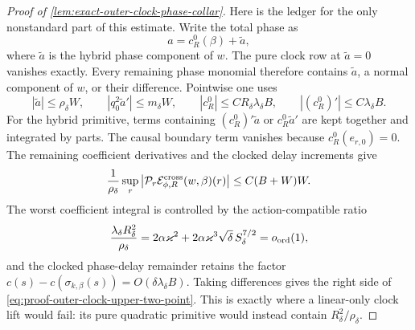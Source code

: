 \begin{proof}[Proof of
\cref{lem:exact-outer-clock-phase-collar}]
Here is the ledger for the only nonstandard part of this estimate.  Write
the total phase as
\[
 a=c_R^0(\beta)+\widetilde a,
\]
where \(\widetilde a\) is the hybrid phase component of \(w\).  The pure
clock row at \(\widetilde a=0\) vanishes exactly.  Every remaining phase
monomial therefore contains \(\widetilde a\), a normal component of
\(w\), or their difference.  Pointwise one uses
\begin{equation}
 |\widetilde a|\le\rho_\delta W,\qquad
 |q_0^2\widetilde a'|\le m_\delta W,\qquad
 |c_R^0|\le CR_\delta\lambda_\delta B,\qquad
 |(c_R^0)'|\le C\lambda_\delta B.               \label{eq:proof-outer-clock-cross-phase-scales}
\end{equation}
For the hybrid primitive, terms containing
\((c_R^0)'\widetilde a\) or
\(c_R^0\widetilde a'\) are kept together and integrated by parts.
The causal boundary term vanishes because \(c_R^0(e_{r,0})=0\).
The remaining coefficient derivatives and the clocked delay increments
give
\begin{equation}
 \frac1{\rho_\delta}
 \sup_r\left|\mathcal P_r
       \mathcal E_{\phi,R}^{\rm cross}(w,\beta)(r)\right|
 \le C(B+W)W.                                   \label{eq:proof-outer-clock-cross-prefix}
\end{equation}
The worst coefficient integral is controlled by the action-compatible
ratio
\begin{equation}
 \frac{\lambda_\delta R_\delta^2}{\rho_\delta}
 =2\alpha\varkappa^2
  +2\alpha\varkappa^3\sqrt\delta\,S_\delta^{7/2}
 =o_{\rm ord}(1),                              \label{eq:proof-outer-clock-cross-closing-scale}
\end{equation}
and the clocked phase-delay remainder retains the factor
\(c(s)-c(\sigma_{k,\beta}(s))=O(\delta\lambda_\delta B)\).
Taking differences gives the right side of
\cref{eq:proof-outer-clock-upper-two-point}.  This is exactly where a
linear-only clock lift would fail: its pure quadratic primitive would
instead contain \(R_\delta^2/\rho_\delta\).


\end{proof}
